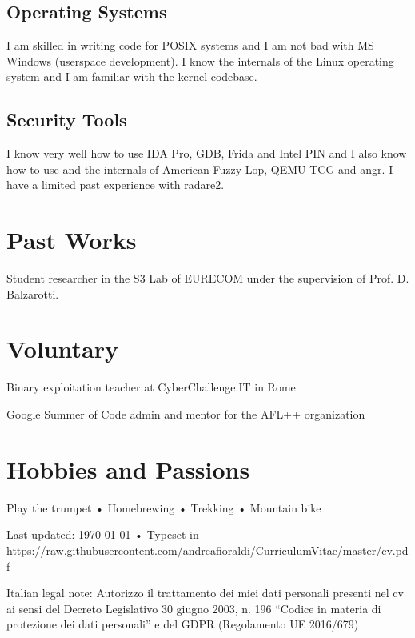 \documentclass[10pt, a4paper]{article}
\newcommand{\years}[1]{\marginnote{\scriptsize #1}}
\begin{document}
\subsection*{Operating Systems}

I am skilled in writing code for POSIX systems and I am not bad with MS Windows (userspace development).
I know the internals of the Linux operating system and I am familiar with the kernel codebase.

\subsection*{Security Tools}

I know very well how to use IDA Pro, GDB, Frida and Intel PIN and I also know how to use and the internals of American Fuzzy Lop, QEMU TCG and angr.
I have a limited past experience with radare2.

\section*{Past Works}

\noindent
\years{2020} Student researcher in the S3 Lab of EURECOM under the supervision of Prof. D. Balzarotti.

\section*{Voluntary}
\noindent
\years{2018-2020}Binary exploitation teacher at CyberChallenge.IT in Rome

\years{2020}Google Summer of Code admin and mentor for the AFL++ organization

\section*{Hobbies and Passions}
Play the trumpet • Homebrewing • Trekking • Mountain bike

\vfill{}

\begin{center}
{\scriptsize  Last updated: \today\- •\- 
Typeset in \href{http://nitens.org/taraborelli/cvtex}{
\XeTeX }\\
\href{https://raw.githubusercontent.com/andreafioraldi/CurriculumVitae/master/cv.pdf}{https://raw.githubusercontent.com/andreafioraldi/CurriculumVitae/master/cv.pdf}}
\end{center}

{\scriptsize Italian legal note: Autorizzo il trattamento dei miei dati personali presenti nel cv ai sensi del Decreto Legislativo 30 giugno 2003, n. 196 “Codice in materia di protezione dei dati personali” e del GDPR (Regolamento UE 2016/679)}
\end{document}
